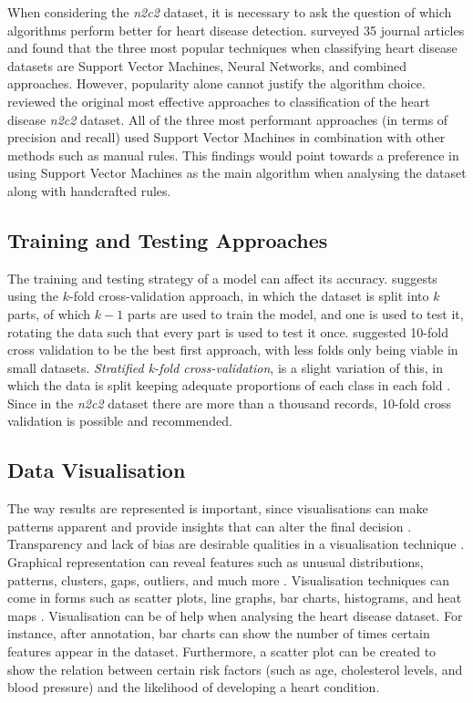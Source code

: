 \documentclass[a4paper,11pt]{article}
\begin{document}
When considering the \textit{n2c2} dataset, it is necessary to ask the question
of which algorithms perform better for heart disease detection.
\textcite{Khan2019} surveyed 35 journal articles and found that the three most
popular techniques when classifying heart disease datasets are Support Vector
Machines, Neural Networks, and combined approaches.
However, popularity alone cannot justify the algorithm choice.
\textcite{Stubbs2015} reviewed the original most effective approaches to
classification of the heart disease \textit{n2c2} dataset.
All of the three most performant approaches (in terms of precision and recall)
used Support Vector Machines in combination with other methods such as manual
rules.
This findings would point towards a preference in using Support Vector Machines
as the main algorithm when analysing the dataset along with handcrafted rules.

\subsection{Training and Testing Approaches}

The training and testing strategy of a model can affect its accuracy.
\textcite[39]{Consoli2019} suggests using the \(k\)-fold cross-validation approach,
in which the dataset is split into \(k\) parts, of which \(k-1\) parts are used
to train the model, and one is used to test it, rotating the data such that
every part is used to test it once.
\textcite{Wong2020} suggested 10-fold cross validation to be the best first
approach, with less folds only being viable in small datasets.
\textit{Stratified k-fold cross-validation}, is a slight variation of this,
in which the data is split keeping adequate proportions of each class in each fold \parencite{Mueller2017}.
Since in the \textit{n2c2} dataset there are more than a thousand records,
10-fold cross validation is possible and recommended.

\subsection{Data Visualisation}

The way results are represented is important, since visualisations can make
patterns apparent and provide insights that can alter the final decision
\parencite{Hendriks2019}.
Transparency and lack of bias are desirable qualities in a visualisation
technique \parencite{Hendriks2019}.
Graphical representation can reveal features such as unusual distributions,
patterns, clusters, gaps, outliers, and much more \parencite{Unwin2020}.
Visualisation techniques can come in forms such as scatter plots, line graphs,
bar charts, histograms, and heat maps \parencite{Sadiku2016}.
Visualisation can be of help when analysing the heart disease dataset.
For instance, after annotation, bar charts can show the number of times certain
features appear in the dataset.
Furthermore, a scatter plot can be created to show the relation between certain
risk factors (such as age, cholesterol levels, and blood pressure) and the
likelihood of developing a heart condition.
\end{document}
